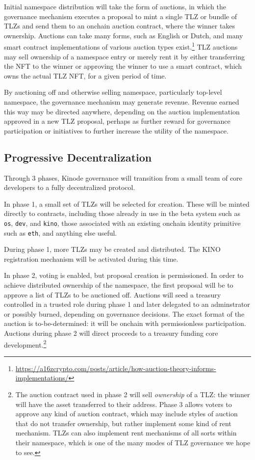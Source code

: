 \documentclass[runningheads]{llncs}
\begin{document}
Initial namespace distribution will take the form of auctions, in which the governance mechanism executes a proposal to mint a single TLZ or bundle of TLZs and send them to an onchain auction contract, where the winner takes ownership.
Auctions can take many forms, such as English or Dutch, and many smart contract implementations of various auction types exist.\footnote{\url{https://a16zcrypto.com/posts/article/how-auction-theory-informs-implementations/}}
TLZ auctions may sell ownership of a namespace entry or merely rent it by either transferring the NFT to the winner or approving the winner to use a smart contract, which owns the actual TLZ NFT, for a given period of time.

By auctioning off and otherwise selling namespace, particularly top-level namespace, the governance mechanism may generate revenue.
Revenue earned this way may be directed anywhere, depending on the auction implementation approved in a new TLZ proposal, perhaps as further reward for governance participation or initiatives to further increase the utility of the namespace.

\subsection{Progressive Decentralization}
\label{sec:decentralization}

Through 3 phases, Kinode governance will transition from a small team of core developers to a fully decentralized protocol.

In phase 1, a small set of TLZs will be selected for creation. These will be minted directly to contracts, including those already in use in the beta system such as \verb|os|, \verb|dev|, and \verb|kino|, those associated with an existing onchain identity primitive such as \verb|eth|, and anything else useful.

During phase 1, more TLZs may be created and distributed.
The KINO registration mechanism will be activated during this time.

In phase 2, voting is enabled, but proposal creation is permissioned.
In order to achieve distributed ownership of the namespace, the first proposal will be to approve a list of TLZs to be auctioned off.
Auctions will seed a treasury controlled in a trusted role during phase 1 and later delegated to an adminstrator or possibly burned, depending on governance decisions.
The exact format of the auction is to-be-determined: it will be onchain with permissionless participation.
Auctions during phase 2 will direct proceeds to a treasury funding core development.\footnote{The auction contract used in phase 2 will sell \textit{ownership} of a TLZ: the winner will have the asset transferred to their address.
Phase 3 allows voters to approve any kind of auction contract, which may include styles of auction that do not transfer ownership, but rather implement some kind of rent mechanism.
TLZs can also implement rent mechanisms of all sorts within their namespace, which is one of the many modes of TLZ governance we hope to see.}
\end{document}

